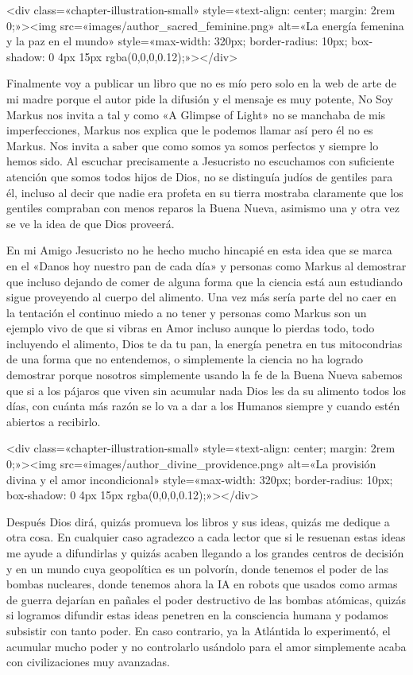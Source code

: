 \documentclass[11pt,a5paper]{book}
\begin{document}
<div class=«chapter-illustration-small» style=«text-align: center; margin: 2rem 0;»><img src=«images/author_sacred_feminine.png» alt=«La energía femenina y la paz en el mundo» style=«max-width: 320px; border-radius: 10px; box-shadow: 0 4px 15px rgba(0,0,0,0.12);»></div>

Finalmente voy a publicar un libro que no es mío pero solo en la web de arte de mi madre porque el autor pide la difusión y el mensaje es muy potente, No Soy Markus nos invita a tal y como «A Glimpse of Light» no se manchaba de mis imperfecciones, Markus nos explica que le podemos llamar así pero él no es Markus. Nos invita a saber que como somos ya somos perfectos y siempre lo hemos sido. Al escuchar precisamente a Jesucristo no escuchamos con suficiente atención que somos todos hijos de Dios, no se distinguía judíos de gentiles para él, incluso al decir que nadie era profeta en su tierra mostraba claramente que los gentiles compraban con menos reparos la Buena Nueva, asimismo una y otra vez se ve la idea de que Dios proveerá.

En mi Amigo Jesucristo no he hecho mucho hincapié en esta idea que se marca en el «Danos hoy nuestro pan de cada día» y personas como Markus al demostrar que incluso dejando de comer de alguna forma que la ciencia está aun estudiando sigue proveyendo al cuerpo del alimento. Una vez más sería parte del no caer en la tentación el continuo miedo a no tener y personas como Markus son un ejemplo vivo de que si vibras en Amor incluso aunque lo pierdas todo, todo incluyendo el alimento, Dios te da tu pan, la energía penetra en tus mitocondrias de una forma que no entendemos, o simplemente la ciencia no ha logrado demostrar porque nosotros simplemente usando la fe de la Buena Nueva sabemos que si a los pájaros que viven sin acumular nada Dios les da su alimento todos los días, con cuánta más razón se lo va a dar a los Humanos siempre y cuando estén abiertos a recibirlo.

<div class=«chapter-illustration-small» style=«text-align: center; margin: 2rem 0;»><img src=«images/author_divine_providence.png» alt=«La provisión divina y el amor incondicional» style=«max-width: 320px; border-radius: 10px; box-shadow: 0 4px 15px rgba(0,0,0,0.12);»></div>

Después Dios dirá, quizás promueva los libros y sus ideas, quizás me dedique a otra cosa. En cualquier caso agradezco a cada lector que si le resuenan estas ideas me ayude a difundirlas y quizás acaben llegando a los grandes centros de decisión y en un mundo cuya geopolítica es un polvorín, donde tenemos el poder de las bombas nucleares, donde tenemos ahora la IA en robots que usados como armas de guerra dejarían en pañales el poder destructivo de las bombas atómicas, quizás si logramos difundir estas ideas penetren en la consciencia humana y podamos subsistir con tanto poder. En caso contrario, ya la Atlántida lo experimentó, el acumular mucho poder y no controlarlo usándolo para el amor simplemente acaba con civilizaciones muy avanzadas.
\end{document}
